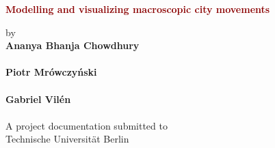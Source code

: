 \begin{titlepage}
	\strut
	\hfill
	\begin{center}
	\vspace{1cm}
		\Huge
		\begin{spacing}{.9}
			\textcolor{DarkRed}{\textbf{Modelling and visualizing macroscopic city movements}}\\
		\end{spacing}
		\vspace{0.8cm}
		\large
		by\\
		\vspace{0.8cm}
		\textbf{Ananya Bhanja Chowdhury}\\
		\\
		\vspace{0.4cm}
		\textbf{Piotr Mrówczyński}\\
		\\
		\vspace{0.4cm}
		\textbf{Gabriel Vilén}\\
		\\
		\vspace{2cm}
	 	A project documentation submitted to\\
		\vspace{0.5cm}
		Technische Universität Berlin\\

\end{center}
\end{titlepage}
